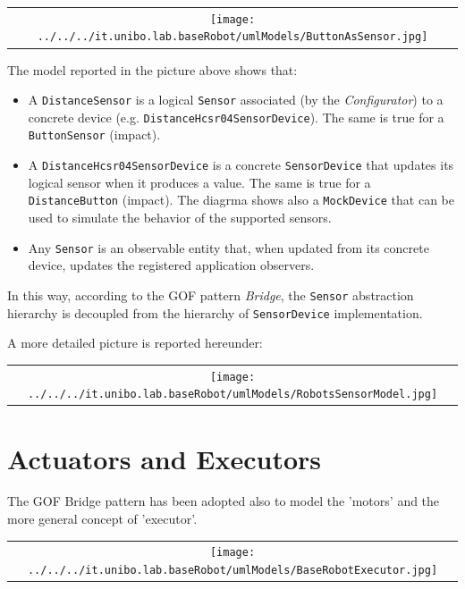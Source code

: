 \begin{center}
\begin{tabular}{ c }
     \texttt{[image: ../../../it.unibo.lab.baseRobot/umlModels/ButtonAsSensor.jpg]}\\
\end{tabular} 
\end{center}

The model reported in the picture above shows that:
\begin{itemize}
	\item A \texttt{DistanceSensor} is a logical \texttt{Sensor} associated (by the \textit{Configurator}) to a concrete device (e.g. \texttt{DistanceHcsr04SensorDevice}). The same is true for a \texttt{ButtonSensor} (impact).
	\item A \texttt{DistanceHcsr04SensorDevice} is a concrete \texttt{SensorDevice} that updates its logical sensor when it produces a value. The same is true for a \texttt{DistanceButton} (impact). The diagrma shows also a \texttt{MockDevice} that can be used to simulate the behavior of the supported sensors.
	\item Any \texttt{Sensor} is an observable entity that, when updated from its concrete device, updates the registered application observers.
\end{itemize}

In this way, according to the GOF pattern \textit{Bridge}, the \texttt{Sensor} abstraction hierarchy is decoupled from the hierarchy of \texttt{SensorDevice} implementation.



A more detailed picture is reported hereunder:
 
\begin{center}
\begin{tabular}{ c }
     \texttt{[image: ../../../it.unibo.lab.baseRobot/umlModels/RobotsSensorModel.jpg]}\\
\end{tabular} 
\end{center}



\section{Actuators and Executors}
 
The GOF Bridge pattern has been adopted also to model the 'motors' and the more general concept of 'executor'.

\begin{center}
\begin{tabular}{ c }
     \texttt{[image: ../../../it.unibo.lab.baseRobot/umlModels/BaseRobotExecutor.jpg]}\\
\end{tabular} 
\end{center}

